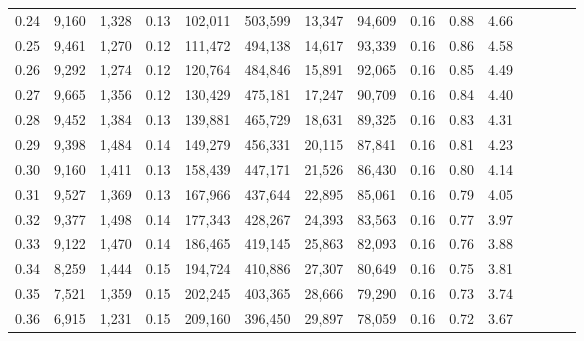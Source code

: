 \begin{tabular}{rrrcrrrrrrrrrrr}
0.24 &   9,160 &   1,328 &                                       0.13 &  102,011 &  503,599 &   13,347 &   94,609 &  0.16 &  0.88 &                         4.66 \\
0.25 &   9,461 &   1,270 &                                       0.12 &  111,472 &  494,138 &   14,617 &   93,339 &  0.16 &  0.86 &                         4.58 \\
0.26 &   9,292 &   1,274 &                                       0.12 &  120,764 &  484,846 &   15,891 &   92,065 &  0.16 &  0.85 &                         4.49 \\
0.27 &   9,665 &   1,356 &                                       0.12 &  130,429 &  475,181 &   17,247 &   90,709 &  0.16 &  0.84 &                         4.40 \\
0.28 &   9,452 &   1,384 &                                       0.13 &  139,881 &  465,729 &   18,631 &   89,325 &  0.16 &  0.83 &                         4.31 \\
0.29 &   9,398 &   1,484 &                                       0.14 &  149,279 &  456,331 &   20,115 &   87,841 &  0.16 &  0.81 &                         4.23 \\
0.30 &   9,160 &   1,411 &                                       0.13 &  158,439 &  447,171 &   21,526 &   86,430 &  0.16 &  0.80 &                         4.14 \\
0.31 &   9,527 &   1,369 &                                       0.13 &  167,966 &  437,644 &   22,895 &   85,061 &  0.16 &  0.79 &                         4.05 \\
0.32 &   9,377 &   1,498 &                                       0.14 &  177,343 &  428,267 &   24,393 &   83,563 &  0.16 &  0.77 &                         3.97 \\
0.33 &   9,122 &   1,470 &                                       0.14 &  186,465 &  419,145 &   25,863 &   82,093 &  0.16 &  0.76 &                         3.88 \\
0.34 &   8,259 &   1,444 &                                       0.15 &  194,724 &  410,886 &   27,307 &   80,649 &  0.16 &  0.75 &                         3.81 \\
0.35 &   7,521 &   1,359 &                                       0.15 &  202,245 &  403,365 &   28,666 &   79,290 &  0.16 &  0.73 &                         3.74 \\
0.36 &   6,915 &   1,231 &                                       0.15 &  209,160 &  396,450 &   29,897 &   78,059 &  0.16 &  0.72 &                         3.67 \\

\end{tabular}

